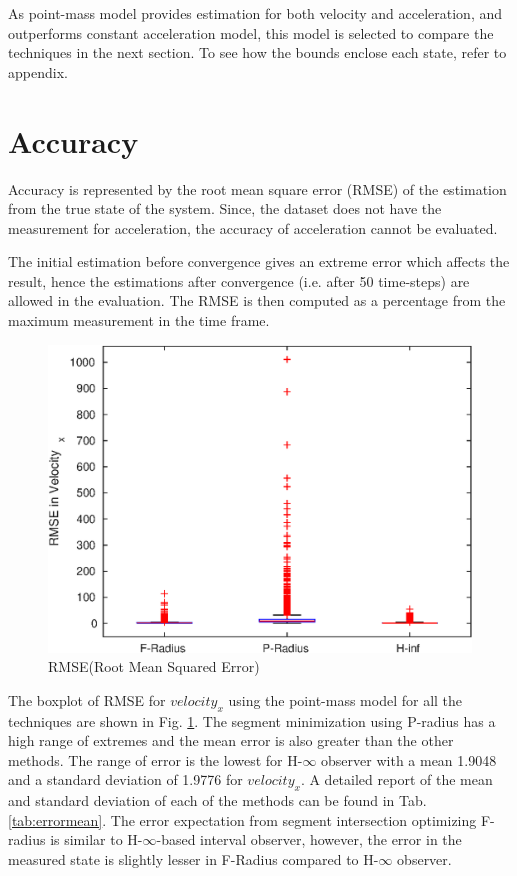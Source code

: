 As point-mass model provides estimation for both velocity and acceleration, and outperforms constant acceleration model, this model is selected to compare the techniques in the next section. To see how the bounds enclose each state, refer to appendix.

\section{Accuracy}
Accuracy is represented by the root mean square error (RMSE) of the estimation from the true state of the system. Since, the dataset does not have the measurement for acceleration, the accuracy of acceleration cannot be evaluated.

The initial estimation before convergence gives an extreme error which affects the result, hence the estimations after convergence (i.e. after 50 time-steps) are allowed in the evaluation. The RMSE is then computed as a percentage from the maximum measurement in the time frame.

\begin{figure}[h]
\centering
\includegraphics[width=\linewidth]{figures/Error/boxplotall}
\caption{RMSE(Root Mean Squared Error)}
\label{fig:boxplot}
\end{figure}

The boxplot of RMSE for $velocity_x$ using the point-mass model for all the techniques are shown in Fig. \ref{fig:boxplot}. The segment minimization using P-radius has a high range of extremes and the mean error is also greater than the other methods. The range of error is the lowest for H-$\infty$ observer with a mean 
1.9048 and a standard deviation of 1.9776 for $velocity_x$. A detailed report of the mean and standard deviation of each of the methods can be found in Tab. \ref{tab:errormean}. The error expectation from segment intersection optimizing F-radius is similar to H-$\infty$-based interval observer, however, the error in the measured state is slightly lesser in F-Radius compared to H-$\infty$ observer.


